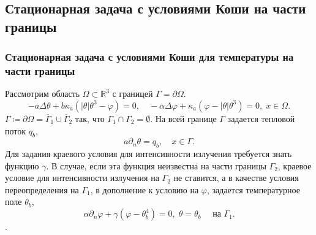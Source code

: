 \subsection{Стационарная задача с условиями Коши на части границы}\label{subsec:st-koshi}
\begin{frame}
    \frametitle{Стационарная задача с условиями Коши для температуры на части границы}
    Рассмотрим область $\Omega\subset \mathbb{R}^3$ с границей $\Gamma=\partial\Omega$.
    \begin{equation}
        \label{eq:2_4:eq1}
        - a\Delta\theta + b\kappa_a(|\theta|\theta^3- \varphi)=0,   \quad
        -\alpha \Delta \varphi + \kappa_a(\varphi-|\theta|\theta^3)=0,\; x\in\Omega.
    \end{equation}
    $\Gamma \coloneqq \partial \Omega =\overline{\Gamma}_1 \cup \overline{\Gamma}_2$
    так, что $\Gamma_1 \cap \Gamma_2 =  \emptyset$.
    На всей границе $\Gamma$ задается тепловой поток $q_b$,
    \begin{equation}
        \label{eq:2_4:bc1}
        a\partial_n\theta = q_b, \quad x\in \Gamma.
    \end{equation}
    Для задания краевого условия для интенсивности излучения требуется знать функцию $\gamma$.
    В случае, если эта функция неизвестна на части границы $\Gamma_2$,
    краевое условие для интенсивности излучения на $\Gamma_2$ не ставится, а в качестве условия
    переопределения на $\Gamma_1$, в дополнение к условию на
    $\varphi$, задается температурное поле $\theta_b$,
    \begin{equation}
        \label{eq:2_4:bc2}
        \alpha\partial_n\varphi + \gamma (\varphi - \theta_b ^4 ) = 0,\;
        \theta=\theta_b\quad \text{ на } \Gamma_1.
    \end{equation}.


\end{frame}


